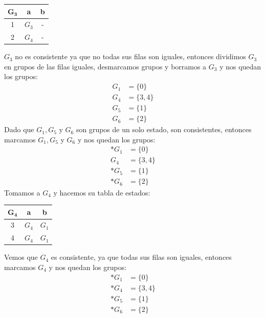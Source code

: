 \documentclass[12pt, letterpaper]{article}
\begin{document}
\begin{enumerate}
\begin{enumerate}
\begin{table}[H]
        \begin{tabular}{|c|c|c|}
          \hline
          $\bm{G_3}$ & \textbf{a} & \textbf{b} \\ \hline
          1             & $G_3$       & -          \\ \hline
          2             & $G_4$       & -          \\ \hline
        \end{tabular}
      \end{table}
      $G_3$ no es consistente ya que no todas sus filas son iguales, entonces dividimos $G_3$ en grupos de las filas iguales, desmarcamos grupos y borramos a $G_3$ y nos quedan los grupos:
      \begin{align*}
        G_1 &= \{0\} \\
        G_4 &= \{3, 4\} \\
        G_5 &= \{1\} \\
        G_6 &= \{2\} 
      \end{align*}
      Dado que $G_1, G_5$ y $G_6$ son grupos de un solo estado, son consistentes, entonces marcamos $G_1, G_5$ y $G_6$ y nos quedan los grupos:
      \begin{align*}
        \ast G_1 &= \{0\} \\
        G_4 &= \{3, 4\} \\
        \ast G_5 &= \{1\} \\
        \ast G_6 &= \{2\}
      \end{align*}
      Tomamos a $G_4$ y hacemos su tabla de estados:
      \begin{table}[H]
        \centering
        \begin{tabular}{|c|c|c|}
          \hline
          $\bm{G_4}$ & \textbf{a} & \textbf{b} \\ \hline
          3             & $G_4$       & $G_1$       \\ \hline
          4             & $G_4$       & $G_1$       \\ \hline
        \end{tabular}
      \end{table}
      Vemos que $G_4$ es consistente, ya que todas sus filas son iguales, entonces marcamos $G_4$ y nos quedan los grupos:
      \begin{align*}
        \ast G_1 &= \{0\} \\
        \ast G_4 &= \{3, 4\} \\
        \ast G_5 &= \{1\} \\
        \ast G_6 &= \{2\}
      \end{align*}

\end{enumerate}
\end{enumerate}
\end{document}

